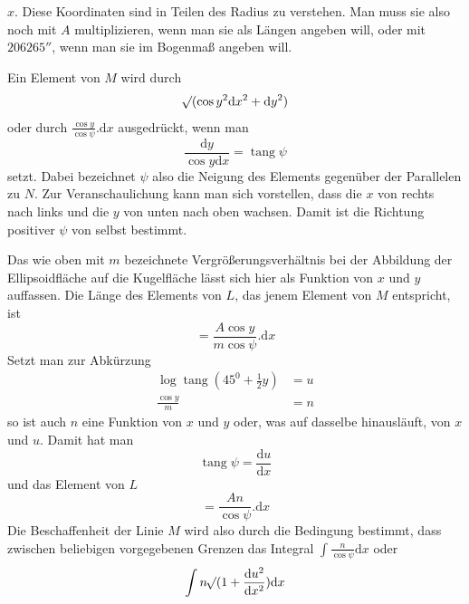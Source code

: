 %
\(x\). Diese Koordinaten sind in Teilen des Radius zu verstehen. Man muss sie also noch mit \(A\) multiplizieren, wenn man sie als Längen angeben will, oder mit \(206265''\), wenn man sie im Bogenmaß angeben will.

Ein Element von \(M\) wird durch
\[
\mathord{{}^{}\!\surd}(\cos y^2\mathrm{d}x^2+\mathrm{d}y^2)
\]
oder durch \(\frac{\cos y}{\cos\psi}\mathord{.}\mathrm{d}x\) ausgedrückt, wenn man
\[
\frac{\mathrm{d}y}{\cos y\mathrm{d}x}=\operatorname{tang}\psi
\]
setzt. Dabei bezeichnet \(\psi\) also die Neigung des Elements gegenüber der Parallelen zu \(N\). Zur Veranschaulichung kann man sich vorstellen, dass die \(x\) von rechts nach links und die \(y\) von unten nach oben wachsen. Damit ist die Richtung positiver \(\psi\) von selbst bestimmt.

Das wie oben mit \(m\) bezeichnete Vergrößerungsverhältnis bei der Abbildung der Ellipsoidfläche auf die Kugelfläche lässt sich hier als Funktion von \(x\) und \(y\) auffassen. Die Länge des Elements von \(L\), das jenem Element von \(M\) entspricht, ist
\[
=\frac{A\cos y}{m\cos\psi}\mathord{.}\mathrm{d}x
\]
Setzt man zur Abkürzung
\[
\begin{aligned}
\log\operatorname{tang}(45^0+\tfrac{1}{2}y)&=u\\
\frac{\cos y}{m}&=n
\end{aligned}
\]
so ist auch \(n\) eine Funktion von \(x\) und \(y\) oder, was auf dasselbe hinausläuft, von \(x\) und \(u\). Damit hat man
\[
\operatorname{tang}\psi=\frac{\mathrm{d}u}{\mathrm{d}x}
\]
und das Element von \(L\)
\[
=\frac{An}{\cos\psi}\mathord{.}\mathrm{d}x
\]
\indent Die Beschaffenheit der Linie \(M\) wird also durch die Bedingung bestimmt, dass zwischen beliebigen vorgegebenen Grenzen das Integral \(\int\frac{n}{\cos\psi}\mathrm{d}x\) oder
\[
\int n\mathord{{}^{}\!\surd}(1+\frac{\mathrm{d}u^2}{\mathrm{d}x^2})\mathrm{d}x
\]
